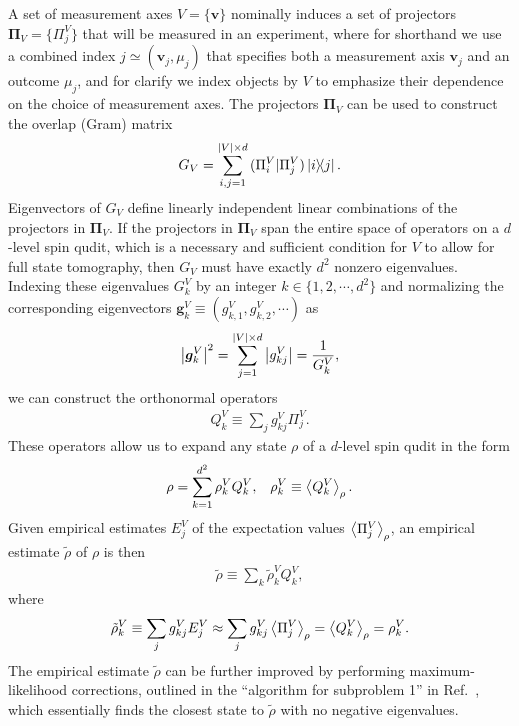 \documentclass[notitlepage,twocolumn]{revtex4-2}
\newcommand{\f}[2]{\dfrac{#1}{#2}} %
\newcommand{\p}[1]{\left(#1\right)} %
\renewcommand{\set}[1]{\{#1\}} %
\newcommand{\bk}{\Braket} %
\renewcommand{\v}{\bm} %
\newcommand{\1}{\mathds{1}}
\def\obk#1{\mathinner{({#1})}}
\begin{document}
A set of measurement axes $V=\set{\v v}$ nominally induces a set of projectors $\v\Pi_V=\set{\Pi_j^V}$ that will be measured in an experiment, where for shorthand we use a combined index $j\simeq\p{\v v_j,\mu_j}$ that specifies both a measurement axis $\v v_j$ and an outcome $\mu_j$, and for clarify we index objects by $V$ to emphasize their dependence on the choice of measurement axes.
The projectors $\v\Pi_V$ can be used to construct the overlap (Gram) matrix
\begin{align}
  G_V = \sum_{i,j=1}^{\abs{V}\times d} \obk{\Pi_i^V|\Pi_j^V} \op{i}{j}.
\end{align}
Eigenvectors of $G_V$ define linearly independent linear combinations of the projectors in $\v\Pi_V$.
If the projectors in $\v\Pi_V$ span the entire space of operators on a $d$-level spin qudit, which is a necessary and sufficient condition for $V$ to allow for full state tomography, then $G_V$ must have exactly $d^2$ nonzero eigenvalues.
Indexing these eigenvalues $G^V_k$ by an integer $k\in\set{1,2,\cdots,d^2}$ and normalizing the corresponding eigenvectors $\v g^V_k\equiv(g^V_{k,1},g^V_{k,2},\cdots)$ as
\begin{align}
  \abs{\v g^V_k}^2 = \sum_{j=1}^{\abs{V}\times d} \abs{g^V_{kj}}
  = \f1{G^V_k},
\end{align}
we can construct the orthonormal operators
\begin{align}
  Q^V_k \equiv \sum_j g^V_{kj} \Pi_j^V.
\end{align}
These operators allow us to expand any state $\rho$ of a $d$-level spin qudit in the form
\begin{align}
  \rho = \sum_{k=1}^{d^2} \rho_k^V Q_k^V,
  &&
  \rho_k^V \equiv \bk{Q^V_k}_\rho.
\end{align}
Given empirical estimates $E_j^V$ of the expectation values $\bk{\Pi_j^V}_\rho$, an empirical estimate $\tilde\rho$ of $\rho$ is then
\begin{align}
  \tilde\rho \equiv \sum_k \tilde\rho^V_k Q^V_k,
\end{align}
where
\begin{align}
  \tilde\rho^V_k \equiv \sum_j g^V_{kj} E_j^V
  \approx \sum_j g^V_{kj} \bk{\Pi_j^V}_\rho
  = \bk{Q^V_k}_\rho
  = \rho^V_k.
\end{align}
The empirical estimate $\tilde\rho$ can be further improved by performing maximum-likelihood corrections, outlined in the ``algorithm for subproblem 1'' in Ref.~\cite{smolin2012efficient}, which essentially finds the closest state to $\tilde\rho$ with no negative eigenvalues.
\end{document}

